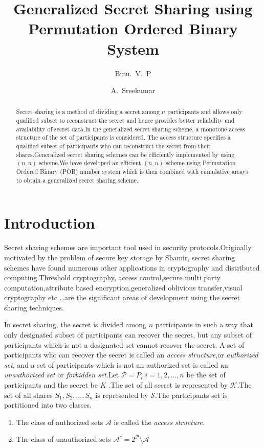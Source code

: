\documentclass{llncs}
\title{Generalized Secret Sharing using Permutation Ordered Binary System}
\author{Binu.~V.~P\inst{1} \and A.~Sreekumar\inst{1}}
\institute{Cochin University of Science and Technology, Cochin 22, India}
\begin{document}
\maketitle
\begin{abstract}
Secret sharing is a method of dividing a secret among $n$ participants and allows only qualified subset to reconstruct the secret and hence provides better reliability and availability of secret data.In the generalized secret sharing scheme, a monotone access structure of the set of participants is considered. The access structure specifies a qualified subset of participants who can  reconstruct the secret from their shares.Generalized secret sharing schemes can be efficiently implemented by using $(n,n)$ scheme.We have developed an efficient $(n,n)$ scheme using  Permutation Ordered Binary (POB) number system which is then combined with cumulative arrays to obtain a generalized secret sharing scheme.
\end{abstract}
\section{Introduction}

Secret sharing schemes are important tool used in security protocols.Originally motivated by the problem of secure key storage by Shamir\cite{shamir1979}, secret sharing schemes have found numerous other applications in cryptography and distributed computing.Threshold cryptography\cite{desmedt1992shared}, access control\cite{naor1998access},secure multi party computation\cite{ben1988completeness}\cite{chaum1988multiparty}\cite{cramer2000general},attribute based encryption\cite{goyal2006attribute}\cite{bethencourt2007ciphertext},generalized oblivious transfer\cite{tassa2011generalized}\cite{shankar2008alternative},visual cryptography \cite{naor1995visual} etc \ldots are the significant areas of development using the secret sharing techniques.

In secret sharing, the secret is divided among $n$ participants in such a way that only designated subset of participants can recover the secret, but any subset of participants which is not a designated set cannot recover the secret.
A set of participants who can recover the secret is called an \textit{access structure},or \textit{authorized set}, and a set of participants which is not an authorized set is called an \textit{unauthorized set} or \textit{forbidden set}.Let $\mathcal{P}={P_i|i=1,2,\ldots,n}$ be the set of participants and the secret be $K$ .The set of all secret is represented by $\mathcal{K}$.The set of all shares $S_1,S_2,\ldots,S_n$ is represented by $\mathcal{S}$.The participants set is partitioned into two classes.\\
\begin{enumerate}
\item The class of authorized sets $\mathcal{A}$ is called the \textit{access structure.}
\item The class of unauthorized sets $\mathcal{A}^c=2^\mathcal{P}\setminus \mathcal{A}$
\end{enumerate}
\end{document}
